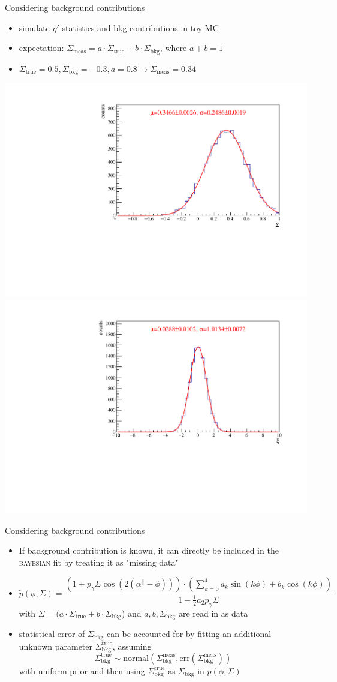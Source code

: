 \documentclass[11pt,aspectratio=169,dvipsnames]{beamer}
\begin{document}
\begin{frame}{Considering background contributions}
	\begin{itemize}
		\item simulate $\eta'$ statistics and bkg contributions in toy MC
		\item expectation: $\Sigma_\text{meas}=a\cdot\Sigma_\text{true}+b\cdot\Sigma_\text{bkg}$, where $a+b=1$
		\item $\Sigma_\text{true}=0.5,\Sigma_\text{bkg}=-0.3,a=0.8 \to \Sigma_\text{meas} = 0.34 $ 
	\end{itemize}
	\includegraphics[width=.49\linewidth]{../../RooFit/plots/sigma.pdf}
		\includegraphics[width=.49\linewidth]{../../RooFit/plots/residuals.pdf}
\end{frame}
\begin{frame}{Considering background contributions}
	\begin{itemize}
	

	\item If background contribution is known, it can directly be included in the \textsc{bayesian} fit by treating it as "missing data"
	\item \begin{equation*}
		\tilde{p}(\phi,\Sigma)=\frac{\left(1+p_\gamma\Sigma\cos\left(2\left(\alpha^\parallel-\phi\right)\right)\right)\cdot\left(\sum_{k=0}^{4}a_k\sin(k\phi)+b_k\cos(k\phi)\right)}{1-\frac{1}{2}a_2p_\gamma\Sigma}
	\end{equation*}
	with $\Sigma=(a\cdot\Sigma_\text{true}+b\cdot\Sigma_\text{bkg}$) and $a,b,\Sigma_\text{bkg}$ are read in as data
	\item statistical error of $\Sigma_\text{bkg}$ can be accounted for by fitting an additional unknown parameter $\Sigma_{\text{bkg}}^{\text{true}}$, assuming $$\Sigma_{\text{bkg}}^{\text{true}}\sim\text{normal}(\Sigma_\text{bkg}^\text{meas},\text{err}(\Sigma_\text{bkg}^\text{meas}))$$ with uniform prior and then using $\Sigma_{\text{bkg}}^{\text{true}}$ as $\Sigma_{\text{bkg}}$ in $p(\phi,\Sigma)$ 
	\end{itemize}
\end{frame}
\end{document}

